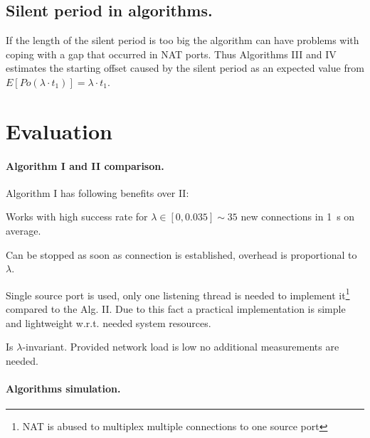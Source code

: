 \documentclass[twoside]{article}
\begin{document}
\begin{multicols}{2}
\subsection{Silent period in algorithms.} If the length of the silent period is too big
the algorithm can have problems with coping with a gap that occurred in NAT ports. Thus 
Algorithms III and IV estimates the starting offset caused by the silent period as an
expected value from $E[Po(\lambda \cdot t_1)] = \lambda\cdot t_1$.

\section{Evaluation}

\paragraph{Algorithm I and II comparison.} 
Algorithm I has following benefits over II:
\begin{compactitem}
 \item Works with high success rate for $\lambda \in [0, 0.035] \sim 35$ new connections in 1~s on average.
 \item Can be stopped as soon as connection is established, overhead is proportional to~$\lambda$.
 \item Single source port is used, only one listening thread is needed to implement
it\footnote{NAT is abused to multiplex multiple connections to one source port} compared to the Alg. II.
Due to this fact a practical implementation is simple and lightweight w.r.t. needed system resources.
 \item Is $\lambda$-invariant. Provided network load is low no additional measurements are needed.
\end{compactitem}

\paragraph{Algorithms simulation.}


\end{multicols}
\end{document}
